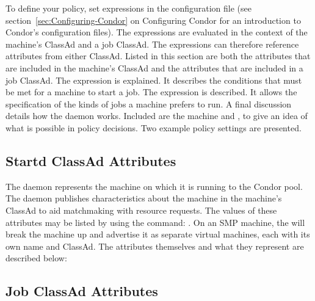 To define your policy, set expressions in
the configuration file (see section~\ref{sec:Configuring-Condor} on
Configuring Condor for an introduction to Condor's
configuration files).
The expressions are evaluated in the context of the machine's ClassAd
and a job ClassAd.
The expressions can therefore reference attributes from either
ClassAd. 
Listed in this section are
both the attributes that are included in the machine's ClassAd and
the attributes that are included in a job ClassAd. 
The  expression is explained.
It describes the conditions that must be met for a machine to
start a job.
The  expression is described.
It allows the specification of
the kinds of jobs a machine prefers to run.
A final discussion details how the  daemon works.
Included are
the machine  and , to give
an idea of what is possible in policy decisions.
Two example policy settings are presented.

\subsection{\label{sec:Startd-Attributes}
Startd ClassAd Attributes}

The  daemon represents the machine on which it is running to
the Condor pool.  
The daemon publishes characteristics about the
machine in the machine's ClassAd to aid matchmaking with resource requests.
The values of these attributes may be listed by using the command:
.
On an SMP machine, the  will break the machine up and advertise
it as separate virtual machines, each with its own name and ClassAd.
The attributes themselves and what they represent are described below:



\subsection{\label{sec:Job-Attributes}
Job ClassAd Attributes}

